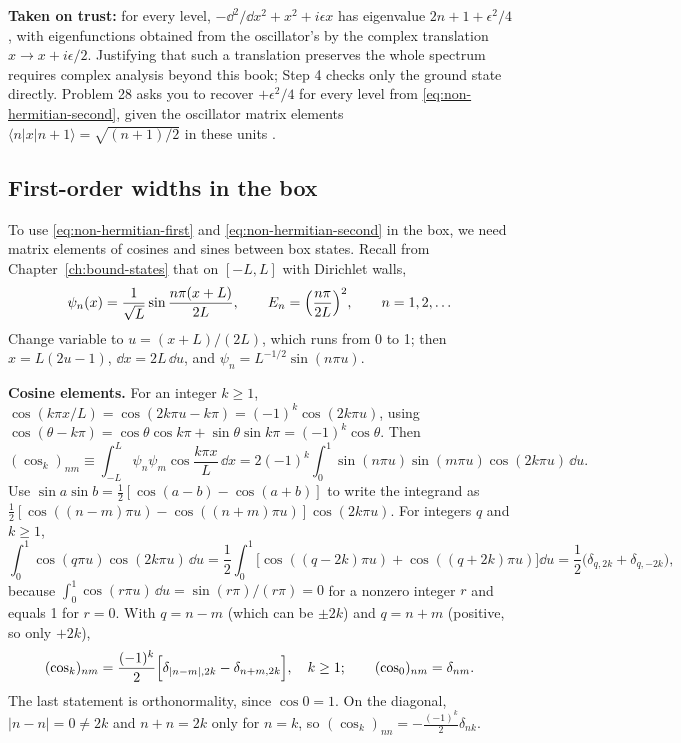 \begin{beyond}
\textbf{Taken on trust:} for every level, $-\dd^2/\dd x^2+x^2+i\epsilon x$ has eigenvalue $2n+1+\epsilon^2/4$, with eigenfunctions obtained from the oscillator's by the complex translation $x\to x+i\epsilon/2$. Justifying that such a translation preserves the whole spectrum requires complex analysis beyond this book; Step 4 checks only the ground state directly. Problem 28 asks you to recover $+\epsilon^2/4$ for every level from \eqref{eq:non-hermitian-second}, given the oscillator matrix elements $\langle n|x|n+1\rangle=\sqrt{(n+1)/2}$ in these units \cite{griffiths}.
\end{beyond}

\subsection{First-order widths in the box}

To use \eqref{eq:non-hermitian-first} and \eqref{eq:non-hermitian-second} in the box, we need matrix elements of cosines and sines between box states. Recall from Chapter~\ref{ch:bound-states} that on $[-L,L]$ with Dirichlet walls,
\begin{equation}
\psi_n(x) = \frac{1}{\sqrt L}\sin\frac{n\pi(x+L)}{2L}, \qquad E_n=\Bigl(\frac{n\pi}{2L}\Bigr)^2, \qquad n=1,2,\dots
\label{eq:non-hermitian-box}
\end{equation}
Change variable to $u=(x+L)/(2L)$, which runs from 0 to 1; then $x=L(2u-1)$, $\dd x = 2L\,\dd u$, and $\psi_n = L^{-1/2}\sin(n\pi u)$.

\textbf{Cosine elements.} For an integer $k\ge1$, $\cos(k\pi x/L)=\cos(2k\pi u - k\pi) = (-1)^k\cos(2k\pi u)$, using $\cos(\theta-k\pi)=\cos\theta\cos k\pi+\sin\theta\sin k\pi = (-1)^k\cos\theta$. Then
\begin{equation}
(\cos_k)_{nm}\equiv\int_{-L}^{L}\psi_n\psi_m\cos\frac{k\pi x}{L}\,\dd x
= 2(-1)^k\int_0^1\sin(n\pi u)\sin(m\pi u)\cos(2k\pi u)\,\dd u .
\end{equation}
Use $\sin a\sin b=\tfrac12[\cos(a-b)-\cos(a+b)]$ to write the integrand as $\tfrac12[\cos((n-m)\pi u)-\cos((n+m)\pi u)]\cos(2k\pi u)$. For integers $q$ and $k\ge1$,
\begin{equation}
\int_0^1\cos(q\pi u)\cos(2k\pi u)\,\dd u = \frac12\int_0^1\bigl[\cos((q-2k)\pi u)+\cos((q+2k)\pi u)\bigr]\dd u = \frac12\bigl(\delta_{q,2k}+\delta_{q,-2k}\bigr),
\end{equation}
because $\int_0^1\cos(r\pi u)\,\dd u=\sin(r\pi)/(r\pi)=0$ for a nonzero integer $r$ and equals 1 for $r=0$. With $q=n-m$ (which can be $\pm2k$) and $q=n+m$ (positive, so only $+2k$),
\begin{equation}
(\cos_k)_{nm} = \frac{(-1)^k}{2}\Bigl[\delta_{|n-m|,2k} - \delta_{n+m,2k}\Bigr],\quad k\ge1;\qquad (\cos_0)_{nm}=\delta_{nm}.
\label{eq:non-hermitian-coselem}
\end{equation}
The last statement is orthonormality, since $\cos 0=1$. On the diagonal, $|n-n|=0\ne2k$ and $n+n=2k$ only for $n=k$, so $(\cos_k)_{nn}=-\tfrac{(-1)^k}{2}\delta_{nk}$.

